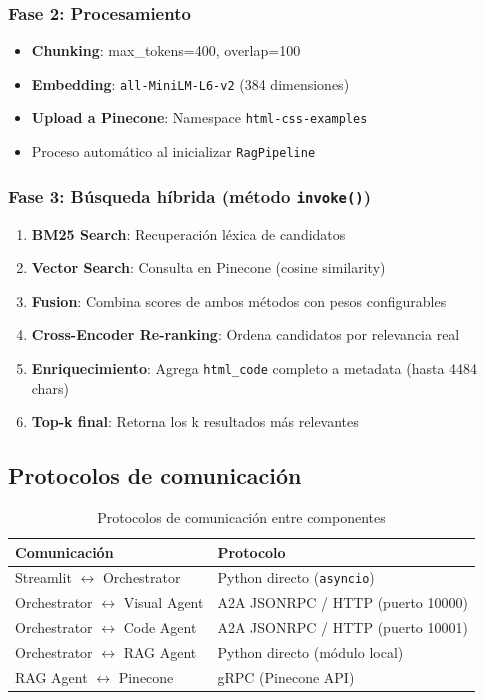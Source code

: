 \documentclass[12pt,a4paper]{article}
\begin{document}
\subsubsection{Fase 2: Procesamiento}
\begin{itemize}
    \item \textbf{Chunking}: max\_tokens=400, overlap=100
    \item \textbf{Embedding}: \texttt{all-MiniLM-L6-v2} (384 dimensiones)
    \item \textbf{Upload a Pinecone}: Namespace \texttt{html-css-examples}
    \item Proceso automático al inicializar \texttt{RagPipeline}
\end{itemize}

\subsubsection{Fase 3: Búsqueda híbrida (método \texttt{invoke()})}
\begin{enumerate}
    \item \textbf{BM25 Search}: Recuperación léxica de candidatos
    \item \textbf{Vector Search}: Consulta en Pinecone (cosine similarity)
    \item \textbf{Fusion}: Combina scores de ambos métodos con pesos configurables
    \item \textbf{Cross-Encoder Re-ranking}: Ordena candidatos por relevancia real
    \item \textbf{Enriquecimiento}: Agrega \texttt{html\_code} completo a metadata (hasta 4484 chars)
    \item \textbf{Top-k final}: Retorna los k resultados más relevantes
\end{enumerate}

\subsection{Protocolos de comunicación}

\begin{table}[H]
\centering
\caption{Protocolos de comunicación entre componentes}
\begin{tabular}{ll}
\toprule
\textbf{Comunicación} & \textbf{Protocolo} \\
\midrule
Streamlit $\leftrightarrow$ Orchestrator & Python directo (\texttt{asyncio}) \\
Orchestrator $\leftrightarrow$ Visual Agent & A2A JSONRPC / HTTP (puerto 10000) \\
Orchestrator $\leftrightarrow$ Code Agent & A2A JSONRPC / HTTP (puerto 10001) \\
Orchestrator $\leftrightarrow$ RAG Agent & Python directo (módulo local) \\
RAG Agent $\leftrightarrow$ Pinecone & gRPC (Pinecone API) \\
\bottomrule
\end{tabular}
\end{table}
\end{document}
